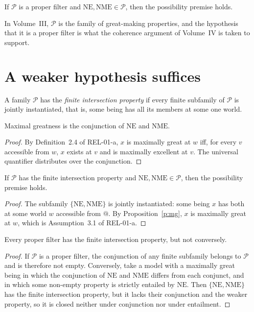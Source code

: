 \documentclass{situationist-preprint}
\begin{document}
\begin{lemma}[Lemma 2417]\label{l:2417}
If $\mathcal{P}$ is a proper filter and $\mathrm{NE}, \mathrm{NME} \in \mathcal{P}$, then the possibility premise holds.
\end{lemma}

In Volume~III, $\mathcal{P}$ is the family of great-making properties, and the hypothesis that it is a proper filter is what the coherence argument of Volume~IV is taken to support.

\section{A weaker hypothesis suffices}

A family $\mathcal{P}$ has the \emph{finite intersection property} if every finite subfamily of $\mathcal{P}$ is jointly instantiated, that is, some being has all its members at some one world.

\begin{proposition}\label{p:mg}
Maximal greatness is the conjunction of $\mathrm{NE}$ and $\mathrm{NME}$.
\end{proposition}

\begin{proof}
By Definition~2.4 of REL-01-a, $x$ is maximally great at $w$ iff, for every $v$ accessible from $w$, $x$ exists at $v$ and is maximally excellent at $v$. The universal quantifier distributes over the conjunction.
\end{proof}

\begin{proposition}\label{p:fip}
If $\mathcal{P}$ has the finite intersection property and $\mathrm{NE}, \mathrm{NME} \in \mathcal{P}$, then the possibility premise holds.
\end{proposition}

\begin{proof}
The subfamily $\{\mathrm{NE}, \mathrm{NME}\}$ is jointly instantiated: some being $x$ has both at some world $w$ accessible from $@$. By Proposition~\ref{p:mg}, $x$ is maximally great at $w$, which is Assumption~3.1 of REL-01-a.
\end{proof}

\begin{proposition}\label{p:weaker}
Every proper filter has the finite intersection property, but not conversely.
\end{proposition}

\begin{proof}
If $\mathcal{P}$ is a proper filter, the conjunction of any finite subfamily belongs to $\mathcal{P}$ and is therefore not empty. Conversely, take a model with a maximally great being in which the conjunction of $\mathrm{NE}$ and $\mathrm{NME}$ differs from each conjunct, and in which some non-empty property is strictly entailed by $\mathrm{NE}$. Then $\{\mathrm{NE}, \mathrm{NME}\}$ has the finite intersection property, but it lacks their conjunction and the weaker property, so it is closed neither under conjunction nor under entailment.
\end{proof}
\end{document}
